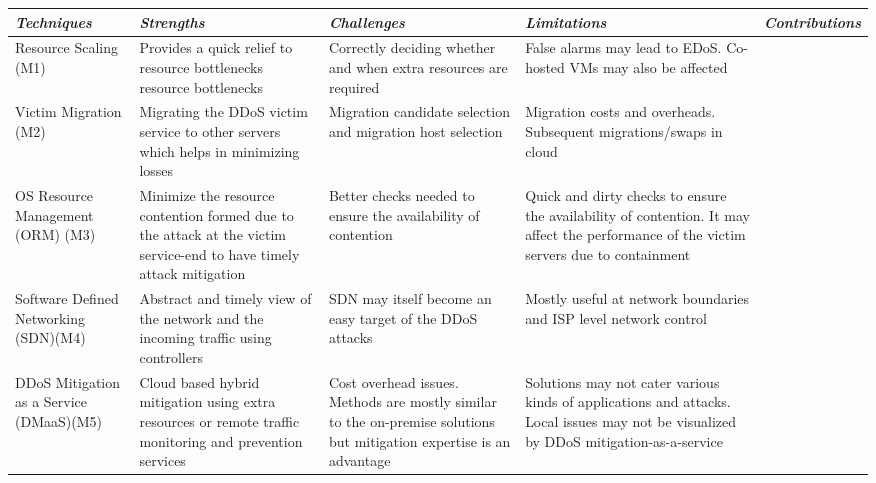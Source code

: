 \documentclass[final,5p,times,twocolumn]{elsarticle}
\begin{document}
\begin{table*}[t]
\begin{center}
\centering
{
\begin{tabular}{|l|l|l|l|l|}\hline
{\it \bf  Techniques}	&	{\it \bf Strengths }		& 	{\it \bf Challenges} 		& {\it \bf Limitations} 			& {\it \bf Contributions}\\ \hline

\parbox{2cm}{Resource Scaling (M1)}  		& \parbox{3.5cm}{ Provides a quick relief to resource bottlenecks resource bottlenecks }  & \parbox{3.5cm}{Correctly deciding  whether and when extra resources are required}  &  \parbox{4cm}{False alarms may lead to EDoS. Co-hosted VMs may also be affected} &  \parbox{2cm} {\cite{RAA}\cite{alqahtaniddos}\cite{canwebeat} \cite{latanicki}\cite{DARAC}}\\\hline

\parbox{2cm}{Victim Migration (M2)}  		& \parbox{3.5cm}{Migrating the DDoS  victim service to other servers which helps in minimizing losses}  & \parbox{3.5cm}{Migration candidate selection and migration host selection }  &  \parbox{4cm}{Migration costs and overheads. Subsequent migrations/swaps in cloud} &  \parbox{2cm} {\cite{defend}\cite{latanicki}\cite{CDNonDemand}}\\\hline

\parbox{2cm}{OS Resource Management (ORM) (M3)}  		& \parbox{3.5cm}{Minimize the resource contention formed due to the attack at the victim service-end to have timely attack mitigation}  & \parbox{3.5cm}{Better checks needed to ensure the availability of contention}  &  \parbox{4cm}{Quick and dirty checks to ensure the availability of contention. It may affect the performance of the victim servers due to containment } &  \parbox{2cm} {\cite{Annals}\cite{VSC}}\\\hline

\parbox{2cm}{Software Defined Networking (SDN)(M4)	}  		& \parbox{3.5cm}{Abstract and timely view of the network and the incoming traffic using controllers}  & \parbox{3.5cm}{SDN may itself become an easy target of the DDoS attacks}  &  \parbox{4cm}{Mostly useful at network boundaries and ISP level network control } &  \parbox{2cm} {\cite{sahay2015towards}\cite{wang2015sdsnm}\cite{cloudddosSDN} \cite{Cloudddossdn3}\cite{yan2015distributed}\cite{wang2015sdsnm}}\\\hline

\parbox{2cm}{DDoS Mitigation as a Service (DMaaS)(M5)}  		& \parbox{3.5cm}{Cloud based hybrid mitigation using extra resources or remote traffic monitoring and prevention services}  & \parbox{3.5cm}{Cost overhead issues. Methods are mostly similar to the on-premise solutions but mitigation expertise is an advantage}  &  \parbox{4cm}{Solutions may not cater various kinds of applications and attacks. Local issues may not be visualized by DDoS mitigation-as-a-service} &  \parbox{2cm} {\cite{DaaS1}\cite{DaaS2}\cite{guenane2014reducing} \cite{amazondiscussionforum}\cite{Cloudwatch}	}\\\hline


\end{tabular}}
\end{center}
\end{table*}
\end{document}

